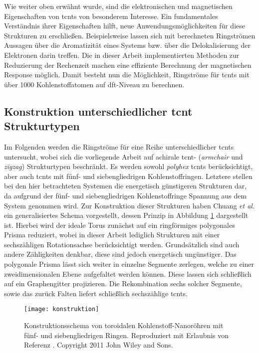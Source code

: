 Wie weiter oben erwähnt wurde, sind die elektronischen und magnetischen Eigenschaften von \acp{tcnt} von besonderem Interesse. Ein fundamentales Verständnis ihrer Eigenschaften hilft, neue Anwendungsmöglichkeiten für diese Strukturen zu erschließen. Beispielsweise lassen sich mit berechneten Ringströmen Aussagen über die Aromatizität eines Systems bzw. über die Delokalisierung der Elektronen darin treffen. Die in dieser Arbeit implementierten Methoden zur Reduzierung der Rechenzeit machen eine effiziente Berechnung der magnetischen Response möglich. Damit besteht nun die Möglichkeit, Ringströme für \acp{tcnt} mit über 1000 Kohlenstoffatomen auf \ac{dft}-Niveau zu berechnen.

\subsection{Konstruktion unterschiedlicher \ac{tcnt} Strukturtypen}
Im Folgenden werden die Ringströme für eine Reihe unterschiedlicher \acp{tcnt} untersucht, wobei sich die vorliegende Arbeit auf achirale \ac{tcnt}- (\textit{armchair} und \textit{zigzag}) Strukturtypen beschränkt. Es werden sowohl \textit{polyhex} \acp{tcnt} berücksichtigt, aber auch \acp{tcnt} mit fünf- und siebengliedrigen Kohlenstoffringen. Letztere stellen bei den hier betrachteten Systemen die energetisch günstigeren Strukturen dar, da aufgrund der fünf- und siebengliedrigen Kohlenstoffringe Spannung aus dem System genommen wird. Zur Konstruktion dieser Strukturen haben Chuang \textit{et al.}\supercite{chuang2009generalized,chuang2009dual,beuerle2011optical} ein generalisiertes Schema vorgestellt, dessen Prinzip in Abbildung \ref{abb:tcntkonstruktion} dargestellt ist. Hierbei wird der ideale Torus zunächst auf ein ringförmiges polygonales Prisma reduziert, wobei in dieser Arbeit lediglich Strukturen mit einer sechszähligen Rotationsachse berücksichtigt werden. Grundsätzlich sind auch andere Zähligkeiten denkbar, diese sind jedoch energetisch ungünstiger. Das polygonale Prisma lässt sich weiter in einzelne Segmente zerlegen, welche zu einer zweidimensionalen Ebene aufgefaltet werden können. Diese lassen sich schließlich auf ein Graphengitter projizieren. Die Rekombination sechs solcher Segmente, sowie das zurück Falten liefert schließlich sechszählige \acp{tcnt}. 
\FloatBarrier
\begin{figure}[ht!]
	\centering
	\texttt{[image: konstruktion]}
	\captionsetup{figurewithin = chapter}
	\captionsetup{font=small, labelfont=bf}\caption[Konstruktionsschema von toroidalen Kohlenstoff-Nanoröhren mit fünf- und siebengliedrigen Ringen]{Konstruktionsschema von toroidalen Kohlenstoff-Nanoröhren mit fünf- und siebengliedrigen Ringen. Reproduziert mit Erlaubnis von Referenz \cite{beuerle2011optical}. Copyright 2011 John Wiley and Sons.}
\label{abb:tcntkonstruktion}
\end{figure}

